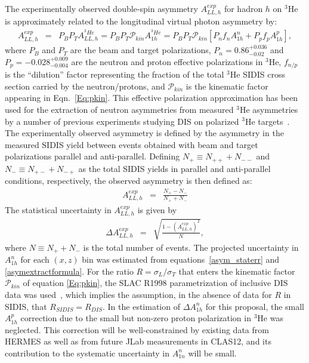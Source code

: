 The experimentally observed double-spin asymmetry $A_{LL,h}^{exp}$ for hadron $h$ on $^3$He is approximately related to the longitudinal virtual photon asymmetry by:
\begin{eqnarray}
  A_{LL,h}^{exp} &=& P_B P_T A_{LL,h}^{^3He} = P_B P_T \mathcal{P}_{kin} A_{1h}^{^3He} = P_B P_T \mathcal{P}_{kin} \left[P_n f_n A_{1h}^n + P_p f_p A_{1h}^p \right], \label{asymextractformula}
\end{eqnarray}
where $P_B$ and $P_T$ are the beam and target polarizations, $P_n = 0.86_{-0.02}^{+0.036}$ and $P_p = -0.028_{-0.004}^{+0.009}$ are the neutron and proton effective polarizations in $^3$He, $f_{n/p}$ is the ``dilution'' factor representing the fraction of the total $^3$He SIDIS cross section carried by the neutron/protons, and $\mathcal{P}_{kin}$ is the kinematic factor appearing in Eqn.~\eqref{Eq:pkin}. This effective polarization approximation has been used for the extraction of neutron asymmetries from measured $^3$He asymmetries by a number of previous experiments studying DIS on polarized $^3$He targets~\cite{E06010_AUT_PRL,E06010_ALT_PRL,A1N_PRL}. The experimentally observed asymmetry is defined by the asymmetry in the measured SIDIS yield between events obtained with beam and target polarizations parallel and anti-parallel. Defining $N_+ \equiv N_{++} + N_{--}$ and $N_{-} \equiv N_{+-} + N_{-+}$ as the total SIDIS yields in parallel and anti-parallel conditions, respectively, the observed asymmetry is then defined as:
\begin{eqnarray}
  A_{LL,h}^{exp} &=& \frac{N_+ - N_-}{N_+ + N_-}
\end{eqnarray}
The statistical uncertainty in $A_{LL,h}^{exp}$ is given by 
\begin{eqnarray}
  \Delta A_{LL,h}^{exp} &=& \sqrt{\frac{1-(A_{LL,h}^{exp})^2}{N}}, \label{asym_staterr}
\end{eqnarray}
where $N \equiv N_+ + N_-$ is the total number of events. The projected uncertainty in $A_{1h}^n$ for each $(x,z)$ bin was estimated from equations~\eqref{asym_staterr} and \eqref{asymextractformula}. For the ratio $R = \sigma_L/\sigma_T$ that enters the kinematic factor $\mathcal{P}_{kin}$ of equation \eqref{Eq:pkin}, the SLAC R1998 parametrization of inclusive DIS data was used~\cite{SLAC_R1998}, which implies the assumption, in the absence of data for $R$ in SIDIS, that $R_{SIDIS} = R_{DIS}$. In the estimation of $\Delta A_{1h}^n$ for this proposal, the small $A_{1h}^p$ correction due to the small but non-zero proton polarization in $^3$He was neglected. This correction will be well-constrained by existing data from HERMES as well as from future JLab measurements in CLAS12, and its contribution to the systematic uncertainty in $A_{1n}^n$ will be small.

